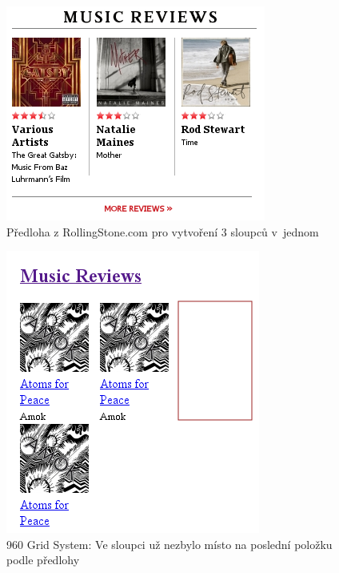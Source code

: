 \documentclass[thesis=B,czech]{FITthesis}[2012/06/26]
\begin{document}
\begin{figure}[h]
	\begin{center}
	\includegraphics[scale=1]{images/image12.png}
	\end{center}
	\caption{Předloha z RollingStone.com pro vytvoření 3 sloupců v~jednom}
	\label{imgGS1}
\end{figure}
\begin{figure}[h]
	\begin{center}
	\includegraphics[scale=1]{images/image09.png}
	\end{center}
	\caption[Využití 960 Grid System]{960 Grid System: Ve sloupci už nezbylo místo na poslední položku podle předlohy}
	\label{imgGS2}
\end{figure}
\end{document}
